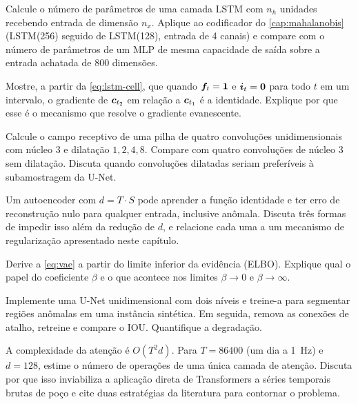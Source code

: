 \begin{exercicios}
\item Calcule o número de parâmetros de uma camada LSTM com $n_h$ unidades recebendo
      entrada de dimensão $n_x$. Aplique ao codificador do \cref{cap:mahalanobis}
      (LSTM(256) seguido de LSTM(128), entrada de 4 canais) e compare com o número de
      parâmetros de um MLP de mesma capacidade de saída sobre a entrada achatada de
      \num{800} dimensões.

\item Mostre, a partir da \cref{eq:lstm-cell}, que quando $\bm{f}_t = \bm{1}$ e
      $\bm{i}_t = \bm{0}$ para todo $t$ em um intervalo, o gradiente de
      $\bm{c}_{t_2}$ em relação a $\bm{c}_{t_1}$ é a identidade. Explique por que
      esse é o mecanismo que resolve o gradiente evanescente.

\item Calcule o campo receptivo de uma pilha de quatro convoluções unidimensionais com
      núcleo 3 e dilatação $1, 2, 4, 8$. Compare com quatro convoluções de núcleo 3 sem
      dilatação. Discuta quando convoluções dilatadas seriam preferíveis à subamostragem
      da U-Net.

\item Um autoencoder com $d = T \cdot S$ pode aprender a função identidade e ter erro de
      reconstrução nulo para qualquer entrada, inclusive anômala. Discuta três formas de
      impedir isso além da redução de $d$, e relacione cada uma a um mecanismo de
      regularização apresentado neste capítulo.

\item Derive a \cref{eq:vae} a partir do limite inferior da evidência (ELBO). Explique
      qual o papel do coeficiente $\beta$ e o que acontece nos limites $\beta \to 0$ e
      $\beta \to \infty$.

\item Implemente uma U-Net unidimensional com dois níveis e treine-a para segmentar
      regiões anômalas em uma instância sintética. Em seguida, remova as conexões de
      atalho, retreine e compare o IOU. Quantifique a degradação.

\item A complexidade da atenção é $O(T^2 d)$. Para $T = \num{86400}$ (um dia a
      \SI{1}{\hertz}) e $d = 128$, estime o número de operações de uma única camada de
      atenção. Discuta por que isso inviabiliza a aplicação direta de Transformers a
      séries temporais brutas de poço e cite duas estratégias da literatura para
      contornar o problema.
\end{exercicios}

